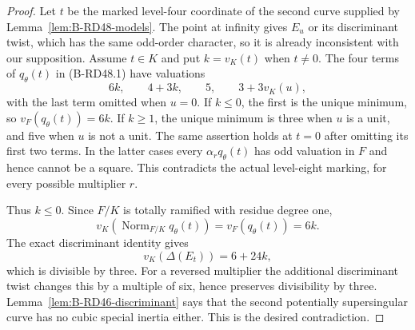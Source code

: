 \begin{proof}
Let $t$ be the marked level-four coordinate of the second
curve supplied by Lemma~\ref{lem:B-RD48-models}.
The point at infinity gives $E_u$ or its discriminant twist,
which has the same odd-order character, so it is already
inconsistent with our supposition. Assume $t\in K$ and put
$k=v_K(t)$ when $t\ne0$.
The four terms of $q_\theta(t)$ in (B-RD48.1) have valuations
\[
                6k,\qquad4+3k,\qquad5,
                         \qquad3+3v_K(u),              \tag{B-RD48.8}
\]
with the last term omitted when $u=0$.
If $k\le0$, the first is the unique minimum, so
$v_F(q_\theta(t))=6k$.
If $k\ge1$, the unique minimum is three when $u$ is a unit,
and five when $u$ is not a unit. The same assertion holds
at $t=0$ after omitting its first two terms.
In the latter cases every
$\alpha_rq_\theta(t)$ has odd valuation in $F$ and hence
cannot be a square. This contradicts the actual level-eight
marking, for every possible multiplier $r$.

Thus $k\le0$. Since $F/K$ is totally ramified with residue
degree one,
\[
          v_K\!\left(\operatorname{Norm}_{F/K}q_\theta(t)\right)
                              =v_F(q_\theta(t))=6k.
\]
The exact discriminant identity gives
\[
                         v_K(\Delta(E_t))=6+24k,
\]
which is divisible by three. For a reversed multiplier the
additional discriminant twist changes this by a multiple of
six, hence preserves divisibility by three.
Lemma~\ref{lem:B-RD46-discriminant} says that the second
potentially supersingular curve has no cubic special inertia
either. This is the desired contradiction.
\end{proof}

